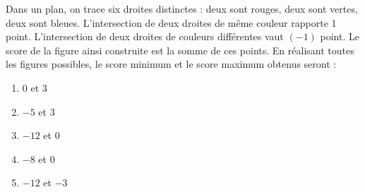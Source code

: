 Dans un plan, on trace six droites distinctes : deux sont rouges, deux sont vertes, deux sont bleues. L'intersection de deux droites de même couleur rapporte 1 point. L'intersection de deux droites de couleurs différentes vaut $(-1)$ point. Le score de la figure ainsi construite est la somme de ces points. En réalisant toutes les figures possibles, le score minimum et le score maximum obtenus seront :
\begin{multicols}{5}
\begin{enumerate}[A/]
\item 0 et 3
\item $-5$ et 3
\item $-12$ et 0
\item $-8$ et 0
\item $-12$ et $-3$
\end{enumerate}
\end{multicols}